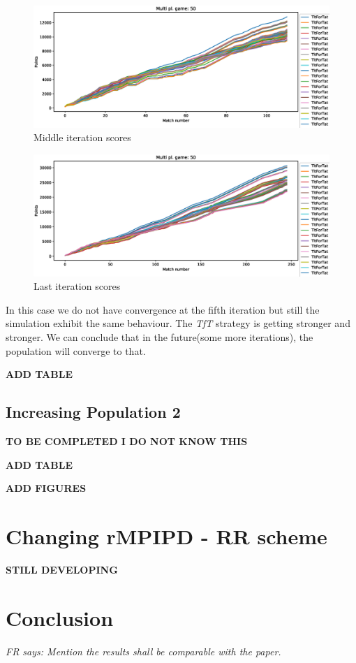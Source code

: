\documentclass[journal,a4paper,10pt,twoside]{IEEEtran} %
\newcommand{\FR}[1]{\textit{\color{ForestGreen}FR says: #1}}
\begin{document}
\begin{figure}[!ht]
    \centering
    \includegraphics[width=1\columnwidth]{../img/ripdmp-incr/ripdmp-scores-increasing-pop-50-r2}
    \caption{Middle iteration scores}
    \label{fig:incrMI}
\end{figure}

\begin{figure}[!ht]
    \centering
    \includegraphics[width=1\columnwidth]{../img/ripdmp-incr/ripdmp-scores-increasing-pop-50-r4}
    \caption{Last iteration scores}
    \label{fig:incrLI}
\end{figure}

In this case we do not have convergence at the fifth iteration but still the simulation exhibit the same behaviour. The \textit{TfT} strategy is getting stronger and stronger. We can conclude that in the future(some more iterations), the population will converge to that.

\textbf{ADD TABLE}

\subsection{Increasing Population 2}
\textbf{TO BE COMPLETED I DO NOT KNOW THIS}

\textbf{ADD TABLE}

\textbf{ADD FIGURES}

\section{Changing rMPIPD - RR scheme} \label{s:crIPDMP}
\textbf{STILL DEVELOPING}

\section{Conclusion} \label{s:conc}

\FR{Mention the results shall be comparable with the paper.}

\balance
%
%
\end{document}
